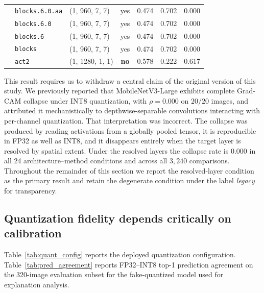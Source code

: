 \documentclass[fleqn,10pt]{wlscirep}
\begin{document}
\begin{table}[!ht]
\begin{tabular}{ll l c ccc}
 & \texttt{blocks.6.0.aa} & (1, 960, 7, 7) & yes & 0.474 & 0.702 & 0.000 \\
 & \texttt{blocks.6.0} & (1, 960, 7, 7) & yes & 0.474 & 0.702 & 0.000 \\
 & \texttt{blocks.6} & (1, 960, 7, 7) & yes & 0.474 & 0.702 & 0.000 \\
 & \texttt{blocks} & (1, 960, 7, 7) & yes & 0.474 & 0.702 & 0.000 \\
 & \texttt{act2} & (1, 1280, 1, 1) & \textbf{no} & \cellcolor{quantred!12}0.578 & \cellcolor{quantred!12}0.222 & \cellcolor{quantred!12}0.617 \\
\bottomrule
\end{tabular}
\end{table}

This result requires us to withdraw a central claim of the original version of this study. We previously reported that MobileNetV3-Large exhibits complete Grad-CAM collapse under INT8 quantization, with $\rho = 0.000$ on $20/20$ images, and attributed it mechanistically to depthwise-separable convolutions interacting with per-channel quantization. That interpretation was incorrect. The collapse was produced by reading activations from a globally pooled tensor, it is reproducible in FP32 as well as INT8, and it disappears entirely when the target layer is resolved by spatial extent. Under the resolved layers the collapse rate is $0.000$ in all 24 architecture--method conditions and across all $3{,}240$ comparisons. Throughout the remainder of this section we report the resolved-layer condition as the primary result and retain the degenerate condition under the label \emph{legacy} for transparency.

\subsection*{Quantization fidelity depends critically on calibration}

Table~\ref{tab:quant_config} reports the deployed quantization configuration. Table~\ref{tab:pred_agreement} reports FP32--INT8 top-1 prediction agreement on the 320-image evaluation subset for the fake-quantized model used for explanation analysis.
\end{document}
